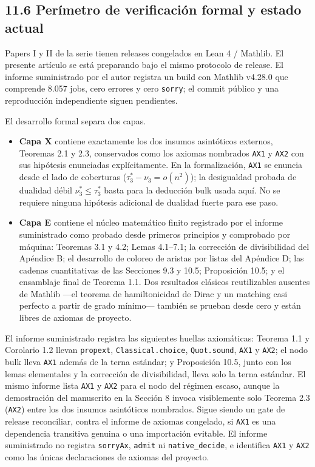 \documentclass[
  11pt,
]{article}
\providecommand{\tightlist}{%
  \setlength{\itemsep}{0pt}\setlength{\parskip}{0pt}}
\begin{document}
\subsection{11.6 Perímetro de verificación formal y estado actual}\label{peruxedmetro-de-verificaciuxf3n-formal-y-estado-actual}

Papers I y II de la serie tienen releases congelados en Lean 4 / Mathlib. El presente artículo se está preparando bajo el mismo protocolo de release. El informe suministrado por el autor registra un build con Mathlib v4.28.0 que comprende 8.057 jobs, cero errores y cero \texttt{sorry}; el commit público y una reproducción independiente siguen pendientes.

El desarrollo formal separa dos capas.

\begin{itemize}
\tightlist
\item
  \textbf{Capa X} contiene exactamente los dos insumos asintóticos externos, Teoremas 2.1 y 2.3, conservados como los axiomas nombrados \texttt{AX1} y \texttt{AX2} con sus hipótesis enunciadas explícitamente. En la formalización, \texttt{AX1} se enuncia desde el lado de coberturas (\(\tau_3^*-\nu_3=o(n^2)\)); la desigualdad probada de dualidad débil \(\nu_3^*\le\tau_3^*\) basta para la deducción bulk usada aquí. No se requiere ninguna hipótesis adicional de dualidad fuerte para ese paso.
\item
  \textbf{Capa E} contiene el núcleo matemático finito registrado por el informe suministrado como probado desde primeros principios y comprobado por máquina: Teoremas 3.1 y 4.2; Lemas 4.1--7.1; la corrección de divisibilidad del Apéndice B; el desarrollo de coloreo de aristas por listas del Apéndice D; las cadenas cuantitativas de las Secciones 9.3 y 10.5; Proposición 10.5; y el ensamblaje final de Teorema 1.1. Dos resultados clásicos reutilizables ausentes de Mathlib ---el teorema de hamiltonicidad de Dirac y un matching casi perfecto a partir de grado mínimo--- también se prueban desde cero y están libres de axiomas de proyecto.
\end{itemize}

El informe suministrado registra las siguientes huellas axiomáticas: Teorema 1.1 y Corolario 1.2 llevan \texttt{propext}, \texttt{Classical.choice}, \texttt{Quot.sound}, \texttt{AX1} y \texttt{AX2}; el nodo bulk lleva \texttt{AX1} además de la terna estándar; y Proposición 10.5, junto con los lemas elementales y la corrección de divisibilidad, lleva solo la terna estándar. El mismo informe lista \texttt{AX1} y \texttt{AX2} para el nodo del régimen escaso, aunque la demostración del manuscrito en la Sección 8 invoca visiblemente solo Teorema 2.3 (\texttt{AX2}) entre los dos insumos asintóticos nombrados. Sigue siendo un gate de release reconciliar, contra el informe de axiomas congelado, si \texttt{AX1} es una dependencia transitiva genuina o una importación evitable. El informe suministrado no registra \texttt{sorryAx}, \texttt{admit} ni \texttt{native\_decide}, e identifica \texttt{AX1} y \texttt{AX2} como las únicas declaraciones de axiomas del proyecto.
\end{document}
